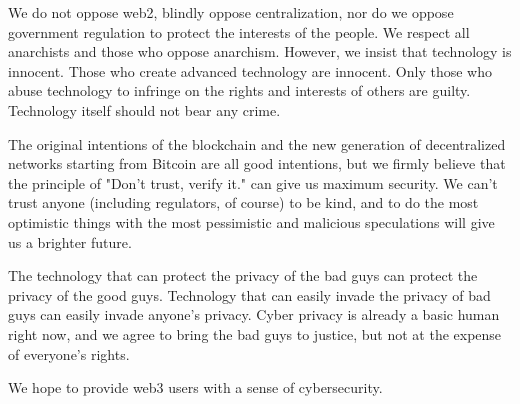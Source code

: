 \documentclass[twocolumn]{article}
\begin{document}
We do not oppose web2, blindly oppose centralization, nor do we oppose government regulation to protect the interests of the people. We respect all anarchists and those who oppose anarchism. However, we insist that technology is innocent. Those who create advanced technology are innocent. Only those who abuse technology to infringe on the rights and interests of others are guilty. Technology itself should not bear any crime.

The original intentions of the blockchain and the new generation of decentralized networks starting from Bitcoin\cite{Bitcin} are all good intentions, but we firmly believe that the principle of "Don't trust, verify it." can give us maximum security. We can’t trust anyone (including regulators, of course) to be kind, and to do the most optimistic things with the most pessimistic and malicious speculations will give us a brighter future.

The technology that can protect the privacy of the bad guys can protect the privacy of the good guys. Technology that can easily invade the privacy of bad guys can easily invade anyone's privacy. Cyber privacy is already a basic human right now, and we agree to bring the bad guys to justice, but not at the expense of everyone's rights.

We hope to provide web3 users with a sense of cybersecurity.




\end{document}
